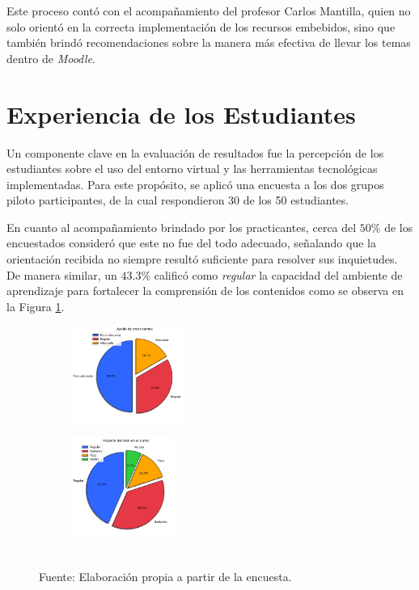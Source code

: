 \documentclass[letter,oneside,12pt,spanish]{report}
\begin{document}
Este proceso contó con el acompañamiento del profesor Carlos Mantilla, quien no solo orientó en la correcta implementación de los recursos embebidos, sino que también brindó recomendaciones sobre la manera más efectiva de llevar los temas dentro de \textit{Moodle}.

\section{Experiencia de los Estudiantes}

Un componente clave en la evaluación de resultados fue la percepción de los estudiantes sobre el uso del entorno virtual y las herramientas tecnológicas implementadas. Para este propósito, se aplicó una encuesta a los dos grupos piloto participantes, de la cual respondieron 30 de los 50 estudiantes.

En cuanto al acompañamiento brindado por los practicantes, cerca del $50\%$ de los encuestados consideró que este no fue del todo adecuado, señalando que la orientación recibida no siempre resultó suficiente para resolver sus inquietudes. De manera similar, un $43.3\%$ calificó como \textit{regular} la capacidad del ambiente de aprendizaje para fortalecer la comprensión de los contenidos como se observa en la Figura \ref{fig:Ayuda_Impacto}.

\begin{figure}[h]
	\centering
    \begin{subfigure}
        \centering
        \includegraphics[width=0.40\textwidth]{Figs/ayuda_practicantes.pdf}
    \end{subfigure}
	\hfill
    \begin{subfigure}
        \centering
        \includegraphics[width=0.37\textwidth]{Figs/impacto_aprendizaje.pdf}
    \end{subfigure}
	\label{fig:Ayuda_Impacto}
	\\ Fuente: Elaboración propia a partir de la encuesta.
\end{figure}
\end{document}
